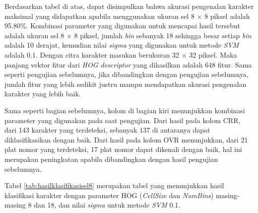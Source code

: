 \noindent Berdasarkan tabel di atas, dapat disimpulkan bahwa akurasi pengenalan karakter maksimal yang didapatkan apabila menggunakan ukuran sel 8 $\times$ 8 piksel adalah 95.80\%. Kombinasi parameter yang digunakan untuk mencapai hasil tersebut adalah ukuran sel 8 $\times$ 8 piksel, jumlah \textit{bin} sebanyak 18 sehingga besar setiap \textit{bin} adalah 10 derajat, kemudian nilai \textit{sigma} yang digunakan untuk metode \textit{SVM} adalah 0.1. Dengan citra karakter masukan berukuran 32 $\times$ 32 piksel. Maka panjang vektor fitur dari \textit{HOG descriptor} yang dihasilkan adalah 648 fitur. Sama seperti pengujian sebelumnya, jika dibandingkan dengan pengujian sebelumnya, jumlah fitur yang lebih sedikit justru mampu mendapatkan akurasi pengenalan karakter yang lebih baik.

\noindent Sama seperti bagian sebelumnya, kolom di bagian kiri menunjukkan kombinasi parameter yang digunakan pada saat pengujian. Dari hasil pada kolom CRR, dari 143 karakter yang terdeteksi, sebanyak 137 di antaranya dapat diklasifikasikan dengan baik. Dari hasil pada kolom OVR menunjukkan, dari 21 plat nomor yang terdeteksi, 17 plat nomor dapat dikenali dengan baik, hal ini merupakan peningkatan apabila dibandingkan dengan hasil pengujian sebelumnya.

\noindent Tabel \ref{tab:hasilklasifikasisel8} merupakan tabel yang menunjukkan hasil klasifikasi karakter dengan parameter HOG (\textit{CellSize} dan \textit{NumBins}) masing-masing 8 dan 18, dan nilai \textit{sigma} untuk metode \textit{SVM} 0.1.

